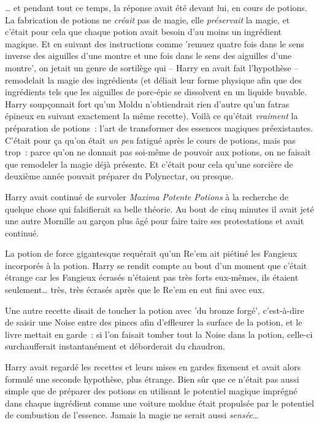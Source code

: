 … et pendant tout ce temps, la réponse avait été devant lui, en cours de potions. La fabrication de potions ne \emph{créait} pas de magie, elle \emph{préservait} la magie, et c'était pour cela que chaque potion avait besoin d'au moins un ingrédient magique. Et en suivant des instructions comme 'remuez quatre fois dans le sens inverse des aiguilles d'une montre et une fois dans le sens des aiguilles d'une montre', on jetait un genre de sortilège qui -- Harry en avait fait l'hypothèse -- remodelait la magie des ingrédients (et déliait leur forme physique afin que des ingrédients tels que les aiguilles de porc-épic se dissolvent en un liquide buvable. Harry soupçonnait fort qu'un Moldu n'obtiendrait rien d'autre qu'un fatras épineux en suivant exactement la même recette). Voilà ce qu'était \emph{vraiment} la préparation de potions~: l'art de transformer des essences magiques préexistantes. C'était pour ça qu'on était \emph{un peu} fatigué après le cours de potions, mais pas trop~: parce qu'on ne donnait pas soi-même de pouvoir aux potions, on ne faisait que remodeler la magie déjà présente. Et c'était pour cela qu'une sorcière de deuxième année pouvait préparer du Polynectar, ou presque.

Harry avait continué de survoler \emph{Maxima Potente Potions} à la recherche de quelque chose qui falsifierait sa belle théorie. Au bout de cinq minutes il avait jeté une autre Mornille au garçon plus âgé pour faire taire ses protestations et avait continué.

La potion de force gigantesque requérait qu'un Re'em ait piétiné les Fangieux incorporés à la potion. Harry se rendit compte au bout d'un moment que c'était étrange car les Fangieux écrasés n'étaient pas très forts eux-mêmes, ils étaient seulement… très, très écrasés après que le Re'em en eut fini avec eux.

Une autre recette disait de toucher la potion avec 'du bronze forgé', c'est-à-dire de saisir une Noise entre des pinces afin d'effleurer la surface de la potion, et le livre mettait en garde~: si l'on faisait tomber tout la Noise dans la potion, celle-ci surchaufferait instantanément et déborderait du chaudron.

Harry avait regardé les recettes et leurs mises en gardes fixement et avait alors formulé une seconde hypothèse, plus étrange. Bien sûr que ce n'était pas aussi simple que de préparer des potions en utilisant le potentiel magique imprégné dans chaque ingrédient comme une voiture moldue était propulsée par le potentiel de combustion de l'essence. Jamais la magie ne serait aussi \emph{sensée}…

